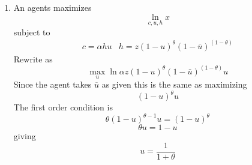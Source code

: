 \documentclass{article}
\begin{document}
\begin{enumerate}
\begin{enumerate}
\item An agents maximizes%
\begin{equation*}
\underset{c,u,h}{\ln }x
\end{equation*}%
subject to 
\begin{equation*}
\begin{array}{ll}
c=\alpha hu & h=z(1-u)^{\theta }\left( 1-\bar{u}\right) ^{\left( 1-\theta
\right) }%
\end{array}%
\end{equation*}%
Rewrite as%
\begin{equation*}
\underset{u}{\max }\ln \alpha z(1-u)^{\theta }\left( 1-\bar{u}\right)
^{\left( 1-\theta \right) }u
\end{equation*}%
Since the agent takes $\overline{u}$ as given this is the same as maximizing%
\begin{equation*}
(1-u)^{\theta }u
\end{equation*}%
The first order condition is%
\begin{equation*}
\theta (1-u)^{\theta -1}u=(1-u)^{\theta }
\end{equation*}%
\begin{equation*}
\theta u=1-u
\end{equation*}%
giving%
\begin{equation*}
u=\frac{1}{1+\theta }
\end{equation*}


\end{enumerate}
\end{enumerate}
\end{document}
